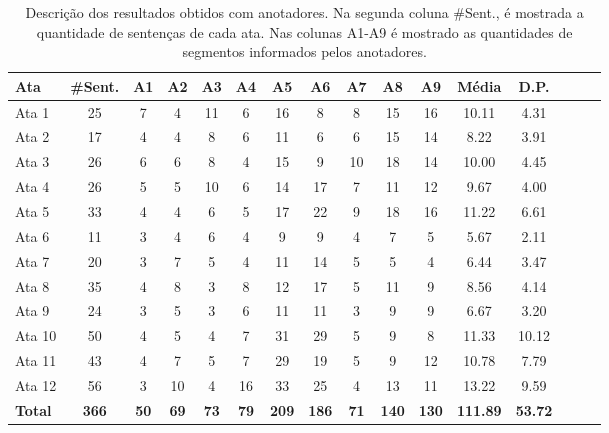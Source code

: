 \begin{table}[!h]
	\small
	\centering
	\begin{tabular}{|l|c|c|c|c|c|c|c|c|c|c|c|c|c|c|c|} \hline
		\textbf{Ata} & \textbf{\#Sent.}  & 
		\textbf{A1}  & 
		\textbf{A2}  & 
		\textbf{A3}  & 
		\textbf{A4}  & 
		\textbf{A5}  & 
		\textbf{A6}  & 
		\textbf{A7}  & 
		\textbf{A8}  & 
		\textbf{A9}  &
		\textbf{Média}&
		\textbf{D.P.}
		\\	\hline
		Ata 1  & 25 & 7  & 4  & 11 & 6  & 16 & 8  & 8  & 15 & 16 & 10.11  &  4.31\\ \hline 
		Ata 2  & 17 & 4  & 4  & 8  & 6  & 11 & 6  & 6  & 15 & 14 & 8.22   &  3.91\\ \hline 
		Ata 3  & 26 & 6  & 6  & 8  & 4  & 15 & 9  & 10 & 18 & 14 & 10.00  &  4.45\\ \hline 
		Ata 4  & 26 & 5  & 5  & 10 & 6  & 14 & 17 & 7  & 11 & 12 & 9.67   &  4.00\\ \hline 
		Ata 5  & 33 & 4  & 4  & 6  & 5  & 17 & 22 & 9  & 18 & 16 & 11.22  &  6.61\\ \hline 
		Ata 6  & 11 & 3  & 4  & 6  & 4  & 9  & 9  & 4  & 7  &  5 & 5.67   &  2.11\\ \hline 
		Ata 7  & 20 & 3  & 7  & 5  & 4  & 11 & 14 & 5  & 5  &  4 & 6.44   &  3.47\\ \hline 
		Ata 8  & 35 & 4  & 8  & 3  & 8  & 12 & 17 & 5  & 11 &  9 & 8.56   &  4.14\\ \hline 
		Ata 9  & 24 & 3  & 5  & 3  & 6  & 11 & 11 & 3  & 9  &  9 & 6.67   &  3.20\\ \hline 
		Ata 10 & 50 & 4  & 5  & 4  & 7  & 31 & 29 & 5  & 9  &  8 & 11.33  & 10.12\\ \hline 
		Ata 11 & 43 & 4  & 7  & 5  & 7  & 29 & 19 & 5  & 9  & 12 & 10.78  &  7.79\\ \hline 
		Ata 12 & 56 & 3  & 10 & 4  & 16 & 33 & 25 & 4  & 13 & 11 & 13.22  &  9.59\\ \hline 
		\textbf{Total} &
		\textbf{366} & 
		\textbf{50}&  
		\textbf{69} & 
		\textbf{73}&  
		\textbf{79}&  
		\textbf{209} & 
		\textbf{186}&  
		\textbf{71}&  
		\textbf{140}&  
		\textbf{130} & 
		\textbf{111.89} & 
		\textbf{53.72}
		\\ \hline 

	\end{tabular}
	\caption{Descrição dos resultados obtidos com anotadores. Na segunda coluna \#Sent., é mostrada a quantidade de sentenças de cada ata. Nas colunas A1-A9 é mostrado as quantidades de segmentos informados pelos anotadores. 
} 


	\label{tab:ataseanotacoes}
\end{table}





